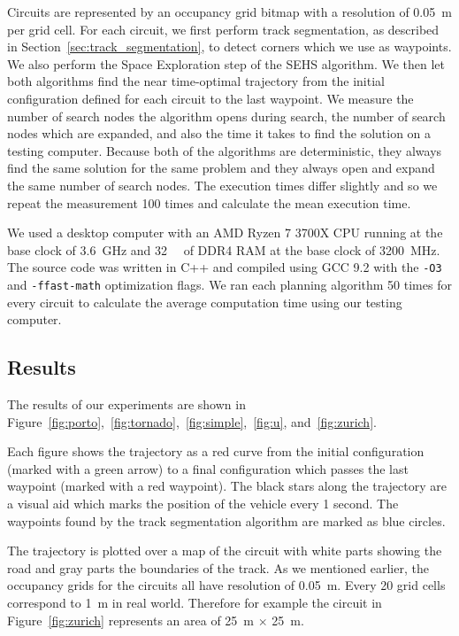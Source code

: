 Circuits are represented by an occupancy grid bitmap with a resolution of \SI{0.05}{\meter} per grid cell. For each circuit, we first perform track segmentation, as described in Section~\ref{sec:track_segmentation}, to detect corners which we use as waypoints. We also perform the Space Exploration step of the SEHS algorithm. We then let both algorithms find the near time-optimal trajectory from the initial configuration defined for each circuit to the last waypoint. We measure the number of search nodes the algorithm opens during search, the number of search nodes which are expanded, and also the time it takes to find the solution on a testing computer. Because both of the algorithms are deterministic, they always find the same solution for the same problem and they always open and expand the same number of search nodes. The execution times differ slightly and so we repeat the measurement 100 times and calculate the mean execution time.

We used a desktop computer with an AMD Ryzen 7 3700X CPU running at the base clock of \SI{3.6}{\giga\hertz} and \SI{32}{\giga\byte} of DDR4 RAM at the base clock of \SI{3200}{\mega\hertz}. The source code was written in C++ and compiled using GCC 9.2 with the \texttt{-O3} and \texttt{-ffast-math} optimization flags. We ran each planning algorithm 50 times for every circuit to calculate the average computation time using our testing computer.

\subsection{Results}

The results of our experiments are shown in Figure~\ref{fig:porto},~\ref{fig:tornado},~\ref{fig:simple},~\ref{fig:u}, and~\ref{fig:zurich}.

Each figure shows the trajectory as a red curve from the initial configuration (marked with a green arrow) to a final configuration which passes the last waypoint (marked with a red waypoint). The black stars along the trajectory are a visual aid which marks the position of the vehicle every 1 second. The waypoints found by the track segmentation algorithm are marked as blue circles.

The trajectory is plotted over a map of the circuit with white parts showing the road and gray parts the boundaries of the track. As we mentioned earlier, the occupancy grids for the circuits all have resolution of \SI{0.05}{\meter}. Every \num{20} grid cells correspond to \SI{1}{\meter} in real world. Therefore for example the circuit in Figure~\ref{fig:zurich} represents an area of \SI{25}{\meter} $\times$ \SI{25}{\meter}.

